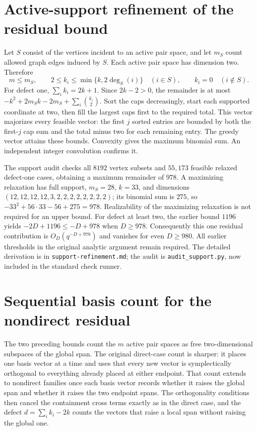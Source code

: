 \documentclass[11pt]{article}
\begin{document}
\section{Active-support refinement of the residual bound}
Let $S$ consist of the vertices incident to an active pair space, and
let $m_S$ count allowed graph edges induced by $S$. Each active pair
space has dimension two. Therefore
\[
 m\le m_S,\qquad 2\le k_i\le\min\{k,2\deg_S(i)\}\quad(i\in S),
 \qquad k_i=0\quad(i\notin S).
\]
For defect one, $\sum_i k_i=2k+1$. Since $2k-2>0$, the remainder is
at most $-k^2+2m_Sk-2m_S+\sum_i\binom{k_i}{2}$.
Sort the caps decreasingly, start each supported coordinate at two,
then fill the largest caps first to the required total. This vector
majorizes every feasible vector: the first $j$ sorted entries are bounded
by both the first-$j$ cap sum and the total minus two for each remaining
entry. The greedy vector attains these bounds. Convexity gives the
maximum binomial sum. An independent integer convolution confirms it.

The support audit checks all $8192$ vertex subsets and $55{,}173$
feasible relaxed defect-one cases, obtaining a maximum remainder of
$978$. A maximizing relaxation has full support, $m_S=28$, $k=33$,
and dimensions $(12,12,12,12,3,2,2,2,2,2,2,2,2)$; its binomial sum
is $275$, so $-33^2+56\cdot33-56+275=978$.
Realizability of the maximizing relaxation is not required for an upper
bound. For defect at least two, the earlier bound $1196$ yields
$-2D+1196\le-D+978$ when $D\ge978$. Consequently this one residual
contribution is $O_D(q^{-D+978})$ and vanishes for even $D\ge980$.
All earlier thresholds in the original analytic argument remain required.
The detailed derivation is in \texttt{support-refinement.md}; the audit
is \texttt{audit\_support.py}, now included in the standard check runner.

\section{Sequential basis count for the nondirect residual}
\label{sec:sequential}
The two preceding bounds count the $m$ active pair spaces as free
two-dimensional subspaces of the global span. The original direct-case
count is sharper: it places one basis vector at a time and uses that every
new vector is symplectically orthogonal to everything already placed at
either endpoint. That count extends to nondirect families once each basis
vector records whether it raises the global span and whether it raises the
two endpoint spans. The orthogonality conditions then cancel the
containment cross terms exactly as in the direct case, and the defect
$d=\sum_ik_i-2k$ counts the vectors that raise a local span without raising
the global one.
\end{document}
